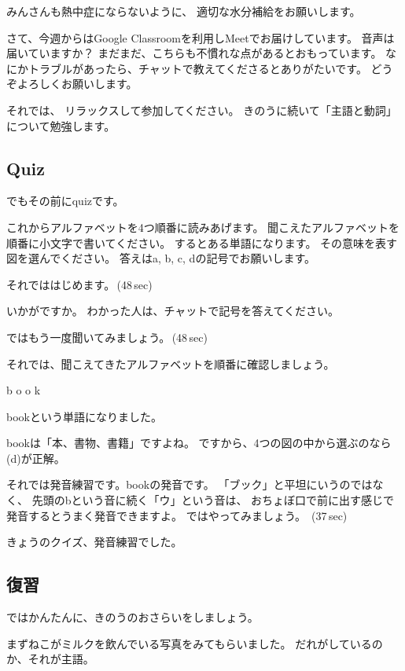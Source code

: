 \documentclass[12pt]{jlreq}
\begin{document}
みんさんも熱中症にならないように、
適切な水分補給をお願いします。

さて、今週からはGoogle Classroomを利用しMeetでお届けしています。
音声は届いていますか？
まだまだ、こちらも不慣れな点があるとおもっています。
なにかトラブルがあったら、チャットで教えてくださるとありがたいです。
どうぞよろしくお願いします。

それでは、
リラックスして参加してください。
{\large \ComputerMouse}
きのうに続いて「主語と動詞」について勉強します。

{\large \ComputerMouse}
\subsection{Quiz}
でもその前にquizです。

これからアルファベットを4つ順番に読みあげます。
聞こえたアルファベットを順番に小文字で書いてください。
するとある単語になります。
その意味を表す図を選んでください。
答えはa, b, c, dの記号でお願いします。


それでははじめます。\faVolumeUp\,(48\,sec)

いかがですか。
わかった人は、チャットで記号を答えてください。


ではもう一度聞いてみましょう。\faVolumeUp\,(48\,sec)

それでは、聞こえてきたアルファベットを順番に確認しましょう。{\large \ComputerMouse}

b
{\large \ComputerMouse}
o
{\large \ComputerMouse}
o
{\large \ComputerMouse}
k

bookという単語になりました。

bookは「本、書物、書籍」ですよね。
ですから、4つの図の中から選ぶのなら(d)が正解。

それでは発音練習です。bookの発音です。
「ブック」と平坦にいうのではなく、
先頭のbという音に続く「ウ」という音は、
おちょぼ口で前に出す感じで発音するとうまく発音できますよ。
ではやってみましょう。
\faVolumeUp\,(37\,sec)

きょうのクイズ、発音練習でした。

{\large \ComputerMouse}

\subsection{復習}
ではかんたんに、きのうのおさらいをしましょう。

まずねこがミルクを飲んでいる写真をみてもらいました。
だれがしているのか、それが主語。
\end{document}
